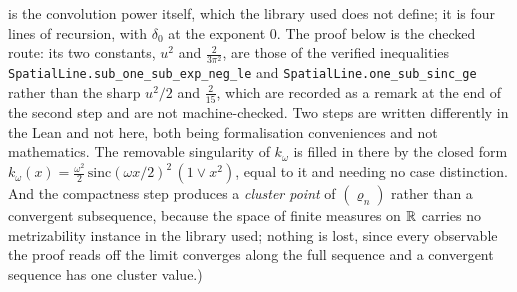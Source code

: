 \begin{theorem}
{is the convolution power itself, which the library used does not define; it is four lines of
recursion, with $\delta_0$ at the exponent $0$. The proof below is the checked route: its two
constants, $u^2$ and $\frac{2}{3\pi^2}$, are those of the verified inequalities
\texttt{SpatialLine.sub\_one\_sub\_exp\_neg\_le} and \texttt{SpatialLine.one\_sub\_sinc\_ge}
rather than the sharp $u^2/2$ and $\frac{2}{15}$, which are recorded as a remark at the end of
the second step and are not machine-checked. Two steps are written differently in the Lean and
not here, both being formalisation conveniences and not mathematics. The removable singularity
of $k_\omega$ is filled in there by the closed form
$k_\omega(x) = \tfrac{\omega^2}{2}\,\mathrm{sinc}(\omega x/2)^2\,(1 \vee x^2)$, equal to it and
needing no case distinction. And the compactness step produces a \emph{cluster point} of
$(\varrho_n)$ rather than a convergent subsequence, because the space of finite measures on
$\mathbb{R}$ carries no metrizability instance in the library used; nothing is lost, since every
observable the proof reads off the limit converges along the full sequence and a convergent
sequence has one cluster value.)}
\end{theorem}

